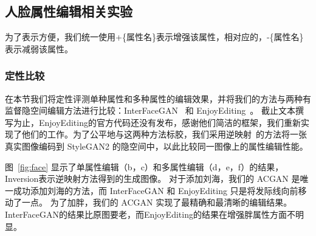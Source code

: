 \subsection{人脸属性编辑相关实验}
为了表示方便，我们统一使用+\{属性名\}表示增强该属性，相对应的，-\{属性名\}表示减弱该属性。

\subsubsection{定性比较}
在本节我们将定性评测单种属性和多种属性的编辑效果，并将我们的方法与两种有监督隐空间编辑方法进行比较：InterFaceGAN~\cite{interfacegan} 和 EnjoyEditing~\cite{iclr2021}。 截止文本撰写为止，EnjoyEditing的官方代码还没有发布，感谢他们简洁的框架，我们重新实现了他们的工作。为了公平地与这两种方法标胶，我们采用逆映射~\cite{image2stylegan}的方法将一张真实图像编码到 StyleGAN2 的隐空间中，以此比较同一图像上的属性编辑性能。

图~\ref{fig:face} 显示了单属性编辑（b，c）和多属性编辑（d，e，f）的结果，Inversion表示逆映射方法得到的生成图像。 对于添加刘海，我们的 ACGAN 是唯一成功添加刘海的方法，而 InterFaceGAN 和 EnjoyEditing 只是将发际线向前移动了一点。 为了加胖，我们的 ACGAN 实现了最精确和最清晰的编辑结果。 InterFaceGAN的结果比原图要老，而EnjoyEditing的结果在增强胖属性方面不明显。


